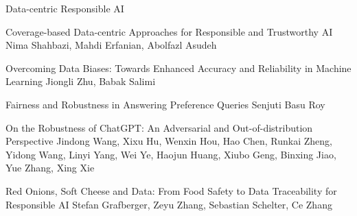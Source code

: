 \documentclass[11pt]{article}
\begin{document}
\begin{bulletin}
\begin{articlesection}{Data-centric Responsible AI}
%
%
\begin{article}
{Coverage-based Data-centric Approaches for Responsible and Trustworthy AI}
{Nima Shahbazi, Mahdi Erfanian, Abolfazl Asudeh}
\setcounter{section}{0}

\end{article}
\begin{article}
{Overcoming Data Biases: Towards Enhanced Accuracy and Reliability
in Machine Learning}
{Jiongli Zhu, Babak Salimi}
\setcounter{section}{0}

\end{article}
\begin{article}
{Fairness and Robustness in Answering Preference Queries}
{Senjuti Basu Roy}
\setcounter{section}{0}

\end{article}
\begin{article}
{On the Robustness of ChatGPT: An Adversarial and Out-of-distribution
Perspective}
{Jindong Wang, Xixu Hu, Wenxin Hou, Hao Chen, Runkai Zheng, Yidong Wang, Linyi Yang, Wei Ye, Haojun Huang, Xiubo Geng, Binxing Jiao, Yue Zhang, Xing Xie}
\setcounter{section}{0}

\end{article}
\begin{article}
{Red Onions, Soft Cheese and Data: From Food Safety to Data Traceability for Responsible AI}
{Stefan Grafberger, Zeyu Zhang, Sebastian Schelter, Ce Zhang}
\setcounter{section}{0}

\end{article}
\end{articlesection}



% 


\end{bulletin}
\end{document}
